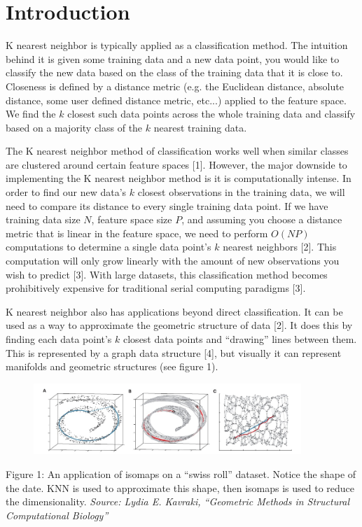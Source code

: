 \section{Introduction}

\vspace{5 mm}
\noindent
K nearest neighbor is typically applied as a classification method. The 
intuition behind it is given some training data and a new data point, you would 
like to classify the new data based on the class of the training data that it 
is close to. Closeness is defined by a distance metric (e.g. the Euclidean 
distance, absolute distance, some user defined distance metric, etc...) applied 
to the feature space. We find the $k$ closest such data points across the whole 
training data and classify based on a majority class of the $k$ nearest 
training data.

\vspace{5 mm}
\noindent
The K nearest neighbor method of classification works well when similar classes 
are clustered around certain feature spaces [1]. However, the major downside to 
implementing the K nearest neighbor method is it is computationally intense. 
In order to find our new data's $k$ closest observations in the training data, 
we will need to compare its distance to every single training data point. 
If we have training data size $N$, feature space size $P$, and assuming you 
choose a distance metric that is linear in the feature space, we need to 
perform $O(NP)$ computations to determine a single data point's $k$ nearest 
neighbors [2]. This computation will only grow linearly with the amount of new 
observations you wish to predict [3]. With large datasets, this classification 
method becomes prohibitively expensive for traditional serial computing 
paradigms [3].


\vspace{5 mm}
\noindent
K nearest neighbor also has applications beyond direct classification. It can 
be used as a way to approximate the geometric structure of data [2]. It does 
this by finding each data point's $k$ closest data points and ``drawing'' lines 
between them. This is represented by a graph data structure [4], but visually it 
can represent manifolds and geometric structures (see figure 1).

\begin{figure}[h]
\centering
\includegraphics[width=0.9\textwidth]{manifold}\\
\end{figure}
Figure 1: An application of isomaps on a ``swiss roll'' dataset. Notice the 
shape of the date. KNN is used to approximate this shape, then isomaps is used 
to reduce the dimensionality. \textit{Source: Lydia E. Kavraki, ``Geometric 
Methods in Structural Computational Biology''}


